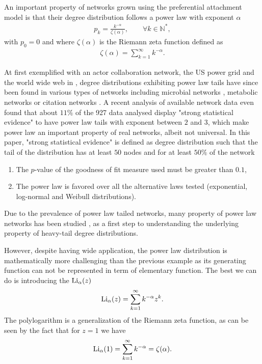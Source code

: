 \documentclass[
11pt, %
english, %
singlespacing, %
nolistspacing, %
liststotoc, %
headsepline, %
]{MastersDoctoralThesis} %
\begin{document}
An important property of networks grown using the preferential attachment model is that their degree distribution follows a power law with exponent $\alpha$
\begin{align}
	p_k = \frac{k^{-\alpha}}{\zeta(\alpha)}, \qquad \forall k \in \mathbb{N}^*, \label{Power law degree distribution}
\end{align}
with $p_0 = 0$ and where $\zeta(\alpha)$ is the Riemann zeta function defined as
\begin{align}
	\zeta(\alpha) = \sum_{k=1}^\infty k^{-\alpha}. \label{Definition Riemann zeta function}
\end{align}

At first exemplified with an actor collaboration network, the US power grid and the world wide web in \cite{barabasi1999emergence}, degree distributions exhibiting power law tails have since been found in various types of networks including microbial networks \cite{agler2016microbial}, metabolic networks \cite{jeong2000large} or citation networks \cite{newman2001structure, jeong2003measuring}. A recent analysis of available network data \cite{broido2018scale} even found that about $11\%$ of the 927 data analysed display "strong statistical evidence" to have power law tails with exponent between $2$ and $3$, which make power law an important property of real networks, albeit not universal. In this paper, "strong statistical evidence" is defined as degree distribution such that the tail of the distribution has at least $50$ nodes and for at least $50\%$ of the network
\begin{enumerate}
	\item The $p$-value of the goodness of fit measure used must be greater than $0.1$,
	\item The power law is favored over all the alternative laws tested (exponential, log-normal and Weibull distributions).
\end{enumerate}
Due to the prevalence of power law tailed networks, many property of power law networks has been studied \cite{aiello2000random, albert2000error, goh2001universal, ichinose2017invasion, pastorsatorras2015epidemic, stumpf2005subnets}, as a first step to understanding the underlying property of heavy-tail degree distributions.

However, despite having wide application, the power law distribution is mathematically more challenging than the previous example as its generating function can not be represented in term of elementary function. The best we can do is introducing the  $\mathrm{Li}_{\alpha}\!\left(z\right)$
\begin{align}
	\mathrm{Li}_{\alpha}\!\left(z\right) = \sum_{k=1}^\infty k^{-\alpha} z^k. \label{Definition of polylogarithm}
\end{align}
The polylogarithm is a generalization of the Riemann zeta function, as can be seen by the fact that for $z = 1$ we have
\begin{align}
	\mathrm{Li}_{\alpha}\!\left(1\right) = \sum_{k=1}^\infty k^{-\alpha} = \zeta(\alpha) \label{Polylogarithm of 1}.
\end{align}
\end{document}
